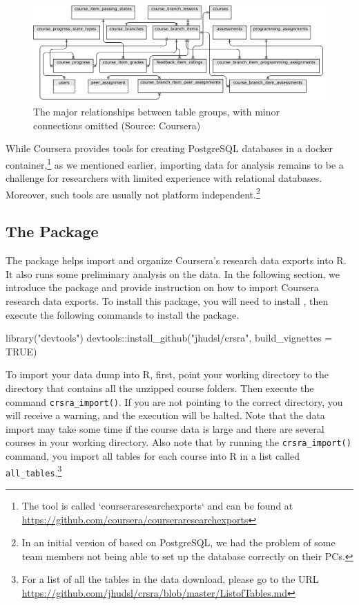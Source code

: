 \begin{figure}[htbp]
    \centering
    \includegraphics[width=\textwidth]{datatables}
    \caption{The major relationships between table groups, with minor connections omitted (Source: Coursera)}
    \label{figure:datatables}
\end{figure}

While Coursera provides tools for creating PostgreSQL databases in a
docker
container,\footnote{The tool is called `courseraresearchexports` and can be found at \url{https://github.com/coursera/courseraresearchexports}}
as we mentioned earlier, importing data for analysis remains to be a
challenge for researchers with limited experience with relational
databases. Moreover, such tools are usually not platform
independent.\footnote{In an initial version of  based on PostgreSQL, we had the problem of some team members not being able to set up the database correctly on their PCs.}

\subsection{\texorpdfstring{The 
Package}{The  Package}}\label{the-package}

The  package helps import and organize Coursera's research
data exports into R. It also runs some preliminary analysis on the data.
In the following section, we introduce the package and provide
instruction on how to import Coursera research data exports. To install
this package, you will need to install 
\citep{devtools}, then execute the following commands to install the
 package.

\begin{Schunk}
\begin{Sinput}
library("devtools")
devtools::install_github("jhudsl/crsra", build_vignettes = TRUE)
\end{Sinput}
\end{Schunk}

To import your data dump into R, first, point your working directory to
the directory that contains all the unzipped course folders. Then
execute the command \texttt{crsra\_import()}. If you are not pointing to
the correct directory, you will receive a warning, and the execution
will be halted. Note that the data import may take some time if the
course data is large and there are several courses in your working
directory. Also note that by running the \texttt{crsra\_import()}
command, you import all tables for each course into R in a list called
\texttt{all\_tables}.\footnote{For a list of all the tables in the data download, please go to the URL \url{https://github.com/jhudsl/crsra/blob/master/ListofTables.md}}

